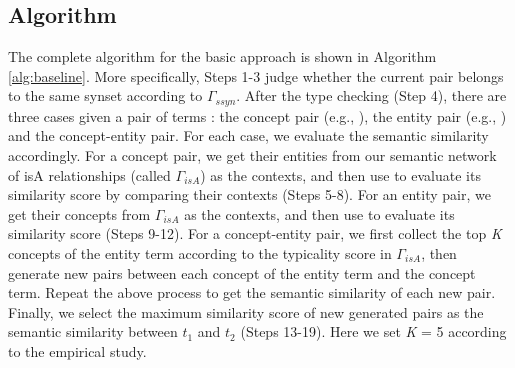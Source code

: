 \subsection{Algorithm}
The complete algorithm for the basic approach is shown in Algorithm \ref{alg:baseline}.
More specifically, Steps 1-3 judge whether the current pair belongs to the same synset according to $\Gamma_{ssyn}$. After the type checking (Step 4),
there are three cases given a pair of terms :
the concept pair (e.g., ),
the entity pair (e.g., ) and the concept-entity pair.
For each case, we evaluate the semantic similarity accordingly.
For a concept pair, we get their entities from our semantic network of isA relationships
(called $\Gamma_{isA}$) as the contexts, and then use 
to evaluate its similarity score by comparing their contexts (Steps 5-8).
For an entity pair, we get their concepts from $\Gamma_{isA}$ as the contexts,
and then use  to evaluate its similarity score (Steps 9-12).
For a concept-entity pair, we first collect the top \emph{K} concepts of the entity term according to the typicality score in $\Gamma_{isA}$,
then generate new pairs between each concept of the entity term and the concept term.
Repeat the above process to get the semantic similarity of each new pair.
Finally, we select the maximum similarity score of new generated pairs
as the semantic similarity between $t_1$ and $t_2$ (Steps 13-19). Here
we set \emph{K} = 5 according to the empirical study.%

